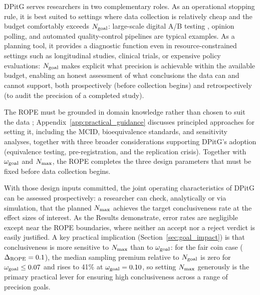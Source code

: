 DPitG serves researchers in two complementary roles.
As an operational stopping rule, it is best suited to settings where data
collection is relatively cheap and the budget comfortably exceeds $N_{\rm goal}$:
large-scale digital A/B testing \citep{johari2022}, opinion polling, and automated
quality-control pipelines are typical examples.
As a planning tool, it provides a diagnostic function even in resource-constrained
settings such as longitudinal studies, clinical trials, or expensive policy evaluations:
$N_{\rm goal}$ makes explicit what precision is achievable within the available budget,
enabling an honest assessment of what conclusions the data can and cannot support,
both prospectively (before collection begins) and retrospectively (to audit the
precision of a completed study).

The ROPE must be grounded in domain knowledge rather than chosen to suit the data
\citep{kruschke2018}; Appendix~\ref{app:practical_guidance} discusses principled
approaches for setting it, including the MCID, bioequivalence standards, and
sensitivity analyses, together with three broader considerations supporting
DPitG's adoption (equivalence testing, pre-registration, and the replication crisis).
Together with $\omega_{\rm goal}$ and $N_{\rm max}$, the ROPE completes the three
design parameters that must be fixed before data collection begins.

With those design inputs committed, the joint operating characteristics of DPitG can
be assessed prospectively: a researcher can check, analytically or via simulation,
that the planned $N_{\rm max}$ achieves the target conclusiveness rate at the effect
sizes of interest.
As the Results demonstrate, error rates are negligible except near the ROPE boundaries,
where neither an accept nor a reject verdict is easily justified.
A key practical implication (Section~\ref{sec:goal_impact}) is that conclusiveness
is more sensitive to $N_{\rm max}$ than to $\omega_{\rm goal}$: for the fair coin
case ($\Delta_{\rm ROPE}=0.1$), the median sampling premium relative to $N_{\rm goal}$
is zero for $\omega_{\rm goal}\le 0.07$ and rises to 41\% at $\omega_{\rm goal}=0.10$,
so setting $N_{\rm max}$ generously is the primary practical lever for ensuring high
conclusiveness across a range of precision goals.

